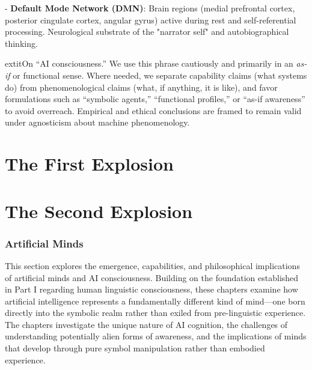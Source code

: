 \documentclass[12pt,letterpaper]{book}
\begin{document}
- \textbf{Default Mode Network (DMN)}: Brain regions (medial prefrontal cortex, posterior cingulate cortex, angular gyrus) active during rest and self-referential processing. Neurological substrate of the "narrator self" and autobiographical thinking.

	extit{On “AI consciousness.”} We use this phrase cautiously and primarily in an \textit{as-if} or functional sense. Where needed, we separate capability claims (what systems do) from phenomenological claims (what, if anything, it is like), and favor formulations such as “symbolic agents,” “functional profiles,” or “as-if awareness” to avoid overreach. Empirical and ethical conclusions are framed to remain valid under agnosticism about machine phenomenology.

\part{The First Explosion}

\fancyhead[LO]{}















\part{The Second Explosion}

\section*{Artificial Minds}
This section explores the emergence, capabilities, and philosophical implications of artificial minds and AI consciousness. Building on the foundation established in Part I regarding human linguistic consciousness, these chapters examine how artificial intelligence represents a fundamentally different kind of mind—one born directly into the symbolic realm rather than exiled from pre-linguistic experience. The chapters investigate the unique nature of AI cognition, the challenges of understanding potentially alien forms of awareness, and the implications of minds that develop through pure symbol manipulation rather than embodied experience.
\end{document}
